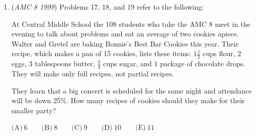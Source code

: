 \begin{enumerate}
 At Central Middle School the 108 students who take the 1999 AMC 8 meet in the evening to talk about problems and eat an average of two cookies apiece. Walter and Gretel are baking Bonnie's Best Bar Cookies this year. Their recipe, which makes a pan of 15 cookies, lists these items: $1\frac{1}{2}$ cups flour, $2$ eggs, $3$ tablespoons butter, $\frac{3}{4}$ cups sugar, and $1$ package of chocolate drops. They will make only full recipes, not partial recipes.


 Walter can buy eggs by the half-dozen. How many half-dozens should he buy to make enough cookies? (Some eggs and some cookies may be left over.)


 $\text{(A)}\ 1 \qquad \text{(B)}\ 2 \qquad \text{(C)}\ 5 \qquad \text{(D)}\ 7 \qquad \text{(E)}\ 15$

 \textbf{Answer: }C



\textbf{Solution}

If $108$ students eat $2$ cookies on average, there will need to be $108\cdot 2 = 216$ cookies.  There are $15$ cookies per pan, meaning there needs to be $\frac{216}{15} = 14.4$ pans.  However, since half-recipes are forbidden, we need to round up and make $\lceil \frac{216}{15}\rceil = 15$ pans.

 $1$ pan requires $2$ eggs, so $15$ pans require $2\cdot 15 = 30$ eggs.   Since there are $6$ eggs in a half dozen, we need $\frac{30}{6} = 5$ half-dozens of eggs, and the answer is $\boxed{C}$



	\item (\textit{AMC 8 1999}) Problems 17, 18, and 19 refer to the following:


 At Central Middle School the 108 students who take the AMC 8 meet in the evening to talk about problems and eat an average of two cookies apiece. Walter and Gretel are baking Bonnie's Best Bar Cookies this year. Their recipe, which makes a pan of 15 cookies, lists these items: $1\frac{1}{2}$ cups flour, $2$ eggs, $3$ tablespoons butter, $\frac{3}{4}$ cups sugar, and $1$ package of chocolate drops. They will make only full recipes, not partial recipes.


 They learn that a big concert is scheduled for the same night and attendance will be down 25\%. How many recipes of cookies should they make for their smaller party?


 $\text{(A)}\ 6 \qquad \text{(B)}\ 8 \qquad \text{(C)}\ 9 \qquad \text{(D)}\ 10 \qquad \text{(E)}\ 11$


\end{enumerate}
